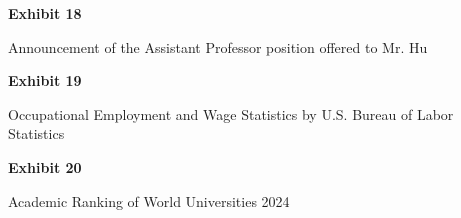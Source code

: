 \documentclass{article}
\begin{document}
% 

\vspace*{\fill}
\begin{center}

{\LARGE \bf
Exhibit 18
}

\vspace{10\baselineskip}

{\large Announcement of the Assistant Professor position offered to Mr. Hu}

\end{center}
\vspace*{\fill}

% 


\vspace*{\fill}
\begin{center}

{\LARGE \bf
Exhibit 19
}

\vspace{10\baselineskip}

{\large Occupational Employment and Wage Statistics by U.S. Bureau of Labor Statistics}

\end{center}
\vspace*{\fill}

% 

% 

% 

% 




\vspace*{\fill}
\begin{center}
{\LARGE \bf
Exhibit 20
}

\vspace{10\baselineskip}

{\large Academic Ranking of World Universities 2024}

\end{center}
\vspace*{\fill}
\end{document}
